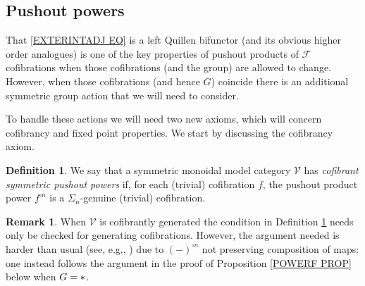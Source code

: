 \documentclass[a4paper,10pt
,draft
]{article}%
\numberwithin{equation}{section}
\numberwithin{figure}{section}
\theoremstyle{definition} %
\newtheorem{definition}[equation]{Definition}%
\newtheorem{remark}[equation]{Remark}%
\newcommand{\V}{\ensuremath{\mathcal V}}
\newcommand{\1}{\ensuremath{\mathbbm 1}}%
\begin{document}
\subsection{Pushout powers}\label{PUSHPOW SEC}

That \eqref{EXTERINTADJ EQ} is a left Quillen bifunctor (and its obvious higher order analogues) is one of the key properties of pushout products of $\mathcal{F}$ cofibrations when those cofibrations (and the group) are allowed to change. However, when those cofibrations (and hence $G$) coincide there is an additional symmetric group action that  we will need to consider.

To handle these actions we will need two new axioms, 
which will concern cofibrancy and fixed point properties. We start by discussing the cofibrancy axiom.


\begin{definition}\label{COFSYMPUSHPOW}
	We say that a symmetric monoidal model category $\mathcal{V}$ has 
	\textit{cofibrant symmetric pushout powers} if,
	for each (trivial) cofibration $f$,
	the pushout product power 
	$f^{\square n}$ is a $\Sigma_n$-genuine 
	(trivial) cofibration.%
\end{definition}


\begin{remark}
When $\mathcal{V}$ is cofibrantly generated
the condition in Definition \ref{COFSYMPUSHPOW} needs only be checked for generating cofibrations. 
However, the argument needed is harder than usual
(see, e.g., \cite[Lemma 2.1.20]{Ho98}) due to $(-)^{\square n}$ not preserving composition of maps:
one instead follows the argument in the proof of 
Proposition \ref{POWERF PROP} below when $G=\**$.
\end{remark}
\end{document}
